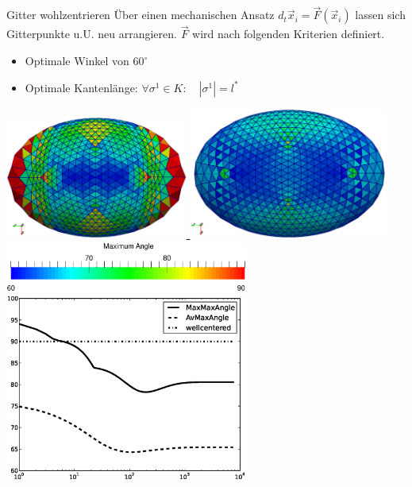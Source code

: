 \documentclass{beamer}
\begin{document}
  \begin{frame}
    \begin{block}{Gitter wohlzentrieren}
      Über einen mechanischen Ansatz \( d_{t}\vec{x}_{i} = \vec{F}\left( \vec{x}_{i} \right)\) lassen sich Gitterpunkte u.U. neu arrangieren.
      \( \vec{F} \) wird nach folgenden Kriterien definiert.
      \begin{itemize}
        \item<2-> Optimale Winkel von \( 60^{\circ} \)
        \item<3-> Optimale Kantenlänge: \( \forall\sigma^{1}\in K:\quad \left| \sigma^{1} \right| = l^{*} \)
      \end{itemize}
    \end{block}
    \begin{overprint}
       \centering\href{run:videos/meshCorr/runVideo.sh}{\includegraphics[width=0.45\textwidth]{videos/meshCorr/step0.eps}\hfill
                                                                   \includegraphics[width=0.49\textwidth]{videos/meshCorr/step1000.eps}\\
                                                                   \includegraphics[width=0.6\textwidth]{videos/meshCorr/bar.eps}}
       \centering\href{run:videos/meshCorr/runVideo.sh}{\includegraphics[width=0.6\textwidth]{videos/meshCorr/plot.eps}}
    \end{overprint}
  \end{frame}
\end{document}
